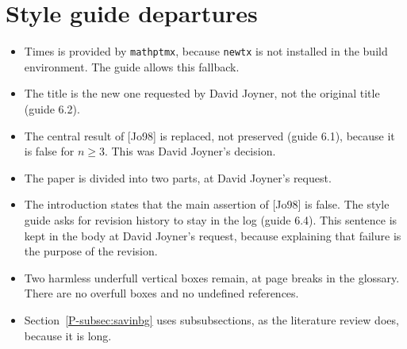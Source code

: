 \documentclass[12pt,letterpaper]{amsart}
\begin{document}
\section{Style guide departures}

\begin{itemize}[leftmargin=1.5em]
\item Times is provided by \texttt{mathptmx}, because \texttt{newtx} is
not installed in the build environment. The guide allows this
fallback.
\item The title is the new one requested by David Joyner, not the
original title (guide 6.2).
\item The central result of [Jo98] is replaced, not preserved (guide
6.1), because it is false for $n\geq 3$. This was David Joyner's
decision.
\item The paper is divided into two parts, at David Joyner's request.
\item The introduction states that the main assertion of [Jo98] is
false. The style guide asks for revision history to stay in the log
(guide 6.4). This sentence is kept in the body at David Joyner's
request, because explaining that failure is the purpose of the
revision.
\item Two harmless underfull vertical boxes remain, at page breaks in
the glossary. There are no overfull boxes and no undefined references.
\item Section~\ref{P-subsec:savinbg} uses subsubsections, as the
literature review does, because it is long.
\end{itemize}
\end{document}
